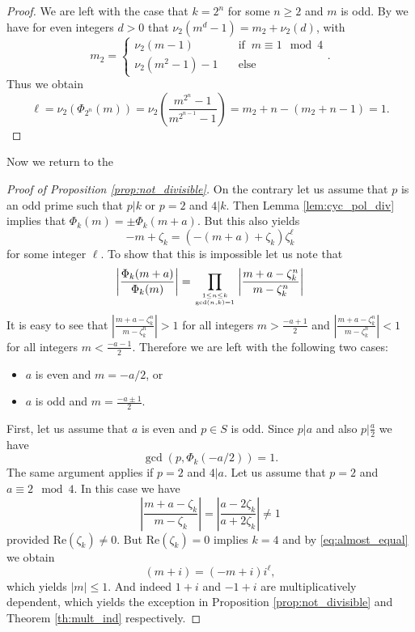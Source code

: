 \documentclass{amsart}
\theoremstyle{plain}
\numberwithin{equation}{section}
\theoremstyle{remark}
\begin{document}
\begin{proof}
We are left with the case that $k=2^n$ for some $n\geq 2$ and $m$ is odd. By \cite[Section 2.1.4, Corollary 
2.1.23]{Cohen:NTI} we have for even integers $d>0$ that $\nu_2(m^d-1)=m_2+\nu_2(d)$, with 
$$m_2=\left\{ \begin{array}{cl} \nu_2(m-1) &\quad \text{if}\;\; m\equiv 1 \mod 4\\
               \nu_2(m^2-1)-1 &\quad \text{else}
              \end{array}\right. .$$
Thus we obtain 
$$\ell=\nu_2(\Phi_{2^n}(m))=\nu_2\left(\frac{m^{2^n}-1}{m^{2^{n-1}}-1}\right)=m_2+n-(m_2+n-1)=1.$$
\end{proof}

Now we return to the
\begin{proof}[Proof of Proposition \ref{prop:not_divisible}]
  On the contrary let us assume that $p$ is an odd prime such that
  $p|k$ or $p=2$ and $4|k$. Then Lemma \ref{lem:cyc_pol_div} implies
  that $\Phi_k(m)=\pm\Phi_k(m+a)$. But this also yields
\begin{equation}\label{eq:almost_equal}
-m+\zeta_k=(-(m+a)+\zeta_k)\zeta_k^\ell
\end{equation}
for some integer $\ell$.  To show that this is impossible let us note
that
$$\left|\frac{\Phi_k(m+a)}{\Phi_k(m)}\right|=\prod_{1\leq n\leq k \atop \gcd(n,k)=1}\left|\frac{m+a-\zeta_k^n}{m-\zeta_k^n}\right|$$
It is easy to see that
$\left|\frac{m+a-\zeta_k^n}{m-\zeta_k^n}\right|>1$ for all integers
$m>\frac{-a+1}2$ and
$\left|\frac{m+a-\zeta_k^n}{m-\zeta_k^n}\right|<1$ for all integers
$m<\frac{-a-1}2$. Therefore we are left with the following two cases:
\begin{itemize}
 \item $a$ is even and $m=-a/2$, or
 \item $a$ is odd and $m=\frac{-a\pm 1}2$.
\end{itemize}
 
First, let us assume that $a$ is even and $p\in S$ is odd. Since $p|a$ and also $p|\frac
a2$ we have
$$\gcd(p,\Phi_k(-a/2))=1.$$
The same argument applies if $p=2$ and $4|a$. Let us assume that $p=2$ and $a\equiv 2\mod 4$. In this case we have
$$\left|\frac{m+a-\zeta_k}{m-\zeta_k}\right|=\left|\frac{a-2\zeta_k}{a+2\zeta_k}\right|\neq 1$$ provided ${\mathrm{Re}}(\zeta_k)\neq 0$.
But ${\mathrm{Re}}(\zeta_k)= 0$ implies $k=4$ and by \eqref{eq:almost_equal} we obtain 
\[(m+i)=(-m+i) i^\ell,\]
which yields $|m|\leq 1$. And indeed $1+i$ and $-1+i$ are multiplicatively dependent, which yields the exception in Proposition \ref{prop:not_divisible} 
and Theorem \ref{th:mult_ind} respectively.


\end{proof}
\end{document}
